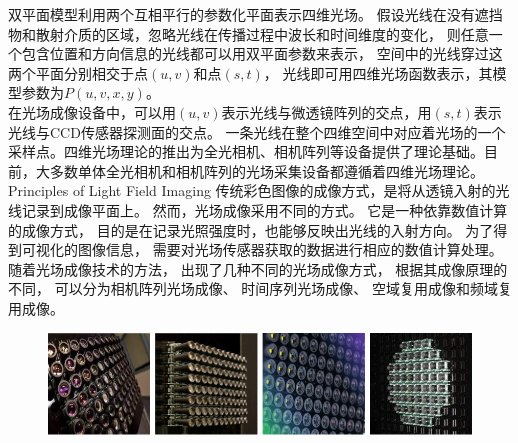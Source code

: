 双平面模型利用两个互相平行的参数化平面表示四维光场。
假设光线在没有遮挡物和散射介质的区域，忽略光线在传播过程中波长和时间维度的变化，
则任意一个包含位置和方向信息的光线都可以用双平面参数来表示，
空间中的光线穿过这两个平面分别相交于点$(u, v)$和点$(s, t)$，
光线即可用四维光场函数表示，其模型参数为$P(u, v, x, y)$。
\\
%
%
%
%
\indent
在光场成像设备中，可以用$(u, v)$表示光线与微透镜阵列的交点，用$(s, t)$表示光线与CCD传感器探测面的交点。
一条光线在整个四维空间中对应着光场的一个采样点。四维光场理论的推出为全光相机、相机阵列等设备提供了理论基础。目前，大多数单体全光相机和相机阵列的光场采集设备都遵循着四维光场理论。
%
%
{Principles of Light Field Imaging}
传统彩色图像的成像方式，是将从透镜入射的光线记录到成像平面上。
然而，光场成像采用不同的方式。
它是一种依靠数值计算的成像方式，
目的是在记录光照强度时，也能够反映出光线的入射方向。
为了得到可视化的图像信息，
需要对光场传感器获取的数据进行相应的数值计算处理。
随着光场成像技术的方法，
出现了几种不同的光场成像方式，
根据其成像原理的不同，
可以分为相机阵列光场成像、
时间序列光场成像、
空域复用成像和频域复用成像。
\begin{figure}[t]
	\centering
	\includegraphics[width=1\linewidth]{figures/chapter2/camera_array}
	\label{chapter2_fig2:camera_array}
\end{figure}
\\
%
%
%
%
\indent
